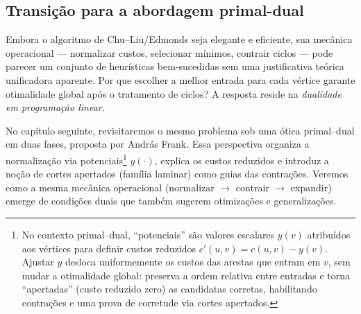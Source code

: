\subsection{Transição para a abordagem primal-dual}

Embora o algoritmo de Chu–Liu/Edmonds seja elegante e eficiente, sua mecânica operacional — normalizar custos, selecionar mínimos, contrair ciclos — pode parecer um conjunto de heurísticas bem-sucedidas sem uma justificativa teórica unificadora aparente. Por que escolher a melhor entrada para cada vértice garante otimalidade global após o tratamento de ciclos? A resposta reside na \emph{dualidade em programação linear}.

No capítulo seguinte, revisitaremos o mesmo problema sob uma ótica primal–dual em duas fases, proposta por András Frank. Essa perspectiva organiza a normalização via potenciais\footnote{No contexto primal–dual, “potenciais” são valores escalares \(y(v)\) atribuídos aos vértices para definir custos reduzidos \(c'(u,v)=c(u,v)-y(v)\). Ajustar \(y\) desloca uniformemente os custos das arestas que entram em \(v\), sem mudar a otimalidade global: preserva a ordem relativa entre entradas e torna “apertadas” (custo reduzido zero) as candidatas corretas, habilitando contrações e uma prova de corretude via cortes apertados.} \(y(\cdot)\), explica os custos reduzidos e introduz a noção de cortes apertados (família laminar) como guias das contrações. Veremos como a mesma mecânica operacional (normalizar \(\to\) contrair \(\to\) expandir) emerge de condições duais que também sugerem otimizações e generalizações.
